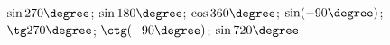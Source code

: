 \begin{ex}[type=calculate]
	\begin{condition}
		\( \sin270\degree \); \( \sin180\degree \); \( \cos360\degree \); \( \sin(-90\degree) \); \( \tg270\degree \); \( \ctg(-90\degree) \); \( \sin720\degree \)
	\end{condition}
\end{ex}